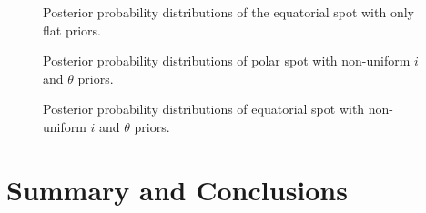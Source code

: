 \documentclass{wihuri}
\begin{document}
\begin{figure}
\centerline{}
\caption{Posterior probability distributions of the equatorial spot with only flat priors.
\label{fig:eqpost}}
\end{figure}

\begin{figure}
\centerline{}
\caption{Posterior probability distributions of polar spot with non-uniform $i$ and $\theta$ priors.
\label{fig:polpostpr}}
\end{figure}

\begin{figure}
\centerline{}
\caption{Posterior probability distributions of equatorial spot with non-uniform $i$ and $\theta$ priors.
\label{fig:eqpostpr}}
\end{figure}
\fi



\section{Summary and Conclusions}










\iffalse
\begin{figure}
\begin{center}
\setlength{\unitlength}{1cm}
\begin{picture}(6,6)(-3,-3)
\put(-1.5,0){\vector(1,0){3}}
\put(2.7,-0.1){$\chi$}
\put(0,-1.5){\vector(0,1){3}}
\multiput(-2.5,1)(0.4,0){13}
{\line(1,0){0.2}}
\multiput(-2.5,-1)(0.4,0){13}
{\line(1,0){0.2}}
\put(0.2,1.4)
{$\beta=v/c=\tanh\chi$}
\qbezier(0,0)(0.8853,0.8853)
(2,0.9640)
\qbezier(0,0)(-0.8853,-0.8853)
(-2,-0.9640)
\end{picture}
\caption{Tässä on hieno kuva}
\label{kuva1}
\end{center}
\end{figure}
\fi


\end{document}
